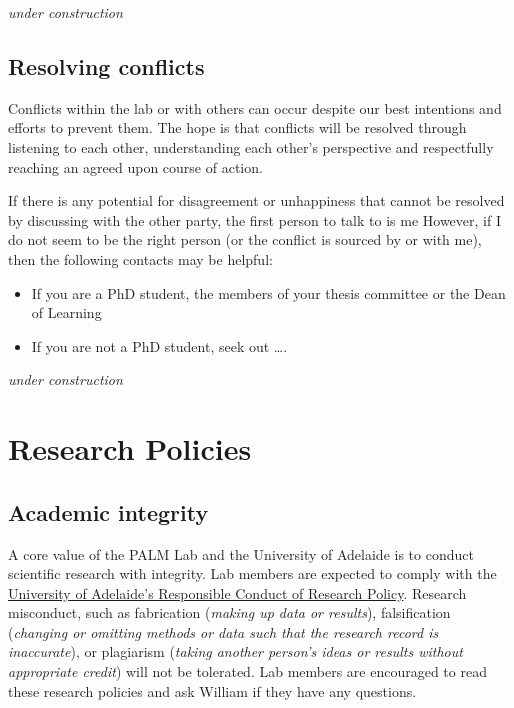 \documentclass[
]{book}
\providecommand{\tightlist}{%
  \setlength{\itemsep}{0pt}\setlength{\parskip}{0pt}}
\begin{document}
\emph{under construction}

\hypertarget{conflicts}{%
\section{Resolving conflicts}\label{conflicts}}

Conflicts within the lab or with others can occur despite our best intentions and efforts to prevent them. The hope is that conflicts will be resolved through listening to each other, understanding each other's perspective and respectfully reaching an agreed upon course of action.

If there is any potential for disagreement or unhappiness that cannot be resolved by discussing with the other party, the first person to talk to is me However, if I do not seem to be the right person (or the conflict is sourced by or with me), then the following contacts may be helpful:

\begin{itemize}
\tightlist
\item
  If you are a PhD student, the members of your thesis committee or the Dean of Learning
\item
  If you are not a PhD student, seek out \ldots.
\end{itemize}

\emph{under construction}

\hypertarget{research-policies}{%
\chapter{Research Policies}\label{research-policies}}

\hypertarget{academic-integrity}{%
\section{Academic integrity}\label{academic-integrity}}

A core value of the PALM Lab and the University of Adelaide is to conduct scientific research with integrity. Lab members are expected to comply with the \href{https://www.adelaide.edu.au/policies/96/}{University of Adelaide's Responsible Conduct of Research Policy}. Research misconduct, such as fabrication (\emph{making up data or results}), falsification (\emph{changing or omitting methods or data such that the research record is inaccurate}), or plagiarism (\emph{taking another person's ideas or results without appropriate credit}) will not be tolerated. Lab members are encouraged to read these research policies and ask William if they have any questions.
\end{document}
